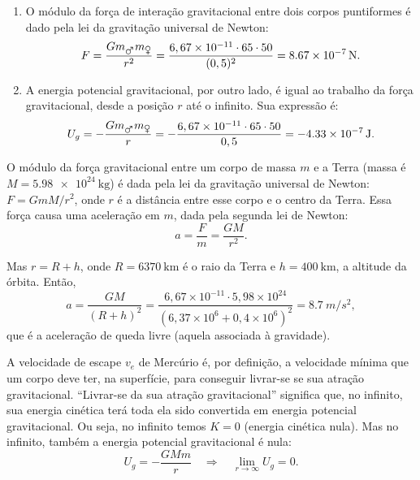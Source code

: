 \documentclass[a4paper]{article}
\newcommand\myrightarrow{\quad\Rightarrow\quad}
\begin{document}
\begin{resolucoes}

  \begin{exercicio}

  \begin{enumerate}
  
  \item O módulo da força de interação gravitacional entre dois corpos puntiformes é dado pela lei da gravitação universal de Newton:
  \begin{equation*}
  F = \frac{Gm_{\mars}m_{\venus}}{r^2} = \frac{6,67\times10^{-11}\cdot65\cdot50}{(0,5)^2} = \SI{8.67e-7}{\newton}.
  \end{equation*}
  
  \item A energia potencial gravitacional, por outro lado, é igual ao trabalho da força gravitacional, desde a posição $r$ até o infinito.
  Sua expressão é:
  \begin{equation*}
  U_g = -\frac{Gm_{\mars}m_{\venus}}{r} = -\frac{6,67\times10^{-11}\cdot65\cdot50}{0,5} = \SI{-4.33e-7}{\joule}.
  \end{equation*}
  \end{enumerate}
  \end{exercicio}
  
  \begin{exercicio*}
   O módulo da força gravitacional entre um corpo de massa $m$ e a Terra (massa é $M = \SI{5.98e24}{\kilo\gram}$) é dada pela lei da gravitação universal de Newton:
  $F = GmM/r^2$, onde $r$ é a distância entre esse corpo e o centro da Terra.
  Essa força causa uma aceleração em $m$, dada pela segunda lei de Newton: 
  \begin{equation*}
  a = \frac{F}{m} = \frac{GM}{r^2}.
  \end{equation*}
  
  Mas $r = R + h$, onde $R = \SI{6370}{\kilo\metre}$ é o raio da Terra e $h = \SI{400}{\kilo\metre}$, a altitude da órbita.
  Então,
  \begin{equation*}
  a = \frac{GM}{(R + h)^2} = \frac{6,67\times10^{-11}\cdot 5,98\times10^{24}}{\left(6,37\times10^{6}+0,4\times10^{6}\right)^2} = \SI{8.7}{m/s^2},
  \end{equation*}
  que é a aceleração de queda livre (aquela associada à gravidade).
  \end{exercicio*}
  
  \begin{exercicio}
   A velocidade de escape $v_e$ de Mercúrio é, por definição, a velocidade mínima que um corpo deve ter, na superfície, para conseguir livrar-se se sua atração gravitacional.
  ``Livrar-se da sua atração gravitacional'' significa que, no infinito, sua energia cinética terá toda ela sido convertida em energia potencial gravitacional. Ou seja, no infinito temos $K = 0$ (energia cinética nula). Mas no infinito, também a energia potencial gravitacional é nula: 
  \begin{equation*}
  U_g = -\frac{GMm}{r} \myrightarrow \lim_{r \to \infty} U_g = 0.
  \end{equation*}


\end{exercicio}
\end{resolucoes}
\end{document}
